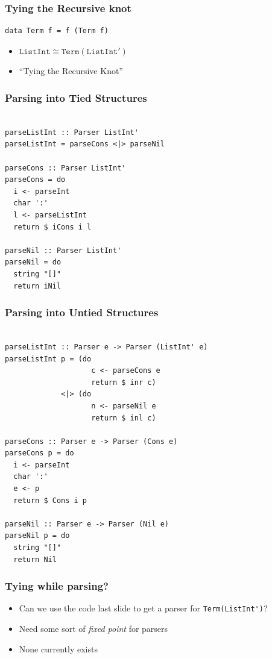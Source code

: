 \documentclass[bigger]{beamer}
\begin{document}
\begin{frame}[fragile]
\frametitle{Tying the Recursive knot}
\label{sec-3}


\begin{lstlisting}
data Term f = f (Term f)
\end{lstlisting}

\begin{itemize}
\item $\mathtt{ListInt} \cong \mathtt{Term (ListInt')}$
\item ``Tying the Recursive Knot''
\end{itemize}
\end{frame}
\begin{frame}[fragile]
\frametitle{Parsing into Tied Structures}
\label{sec-4}


\begin{lstlisting}

parseListInt :: Parser ListInt'
parseListInt = parseCons <|> parseNil

parseCons :: Parser ListInt'
parseCons = do
  i <- parseInt
  char ':'
  l <- parseListInt
  return $ iCons i l

parseNil :: Parser ListInt'
parseNil = do
  string "[]"
  return iNil

\end{lstlisting}
\end{frame}
\begin{frame}[fragile]
\frametitle{Parsing into Untied Structures}
\label{sec-5}


\begin{lstlisting}

parseListInt :: Parser e -> Parser (ListInt' e)
parseListInt p = (do
                    c <- parseCons e
                    return $ inr c)
             <|> (do
                    n <- parseNil e
                    return $ inl c)

parseCons :: Parser e -> Parser (Cons e)
parseCons p = do
  i <- parseInt
  char ':'
  e <- p
  return $ Cons i p

parseNil :: Parser e -> Parser (Nil e)
parseNil p = do
  string "[]"
  return Nil

\end{lstlisting}
\end{frame}
\begin{frame}[fragile]
\frametitle{Tying while parsing?}
\label{sec-6}


\begin{itemize}
\item Can we use the code last slide to get a parser for \verb~Term(ListInt')~?
\item Need some sort of \emph{fixed point} for parsers
\item None currently exists
\end{itemize}
\end{frame}
\end{document}

